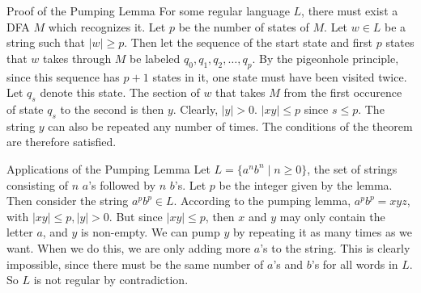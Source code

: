 \documentclass{beamer}
\begin{document}
\begin{frame}{Proof of the Pumping Lemma}
For some regular language $L$, there must exist a DFA $M$ which recognizes it.  Let $p$ be the number of states of $M$.  Let $w \in L$ be a string such that $|w| \geq p$.  Then let the sequence of the start state and first $p$ states that $w$ takes through $M$ be labeled $q_0, q_1, q_2, \ldots, q_p$.  By the pigeonhole principle, since this sequence has $p+1$ states in it, one state must have been visited twice.  Let $q_s$ denote this state.  The section of $w$ that takes $M$ from the first occurence of state $q_s$ to the second is then $y$.  Clearly, $|y| > 0$.  $|xy| \leq p$ since $s \leq p$.  The string $y$ can also be repeated any number of times.  The conditions of the theorem are therefore satisfied.
\end{frame}

\begin{frame}{Applications of the Pumping Lemma}
Let $L = \{a^n b^n \mid n \geq 0\}$, the set of strings consisting of $n$ $a$'s followed by $n$ $b$'s.  Let $p$ be the integer given by the lemma.  Then consider the string $a^p b^p \in L$.  According to the pumping lemma, $a^p b^p = xyz$, with $|xy| \leq p, |y| > 0$.  But since $|xy| \leq p$, then $x$ and $y$ may only contain the letter $a$, and $y$ is non-empty.  We can pump $y$ by repeating it as many times as we want.  When we do this, we are only adding more $a$'s to the string.  This is clearly impossible, since there must be the same number of $a$'s and $b$'s for all words in $L$.  So $L$ is not regular by contradiction.
\end{frame}
\end{document}
